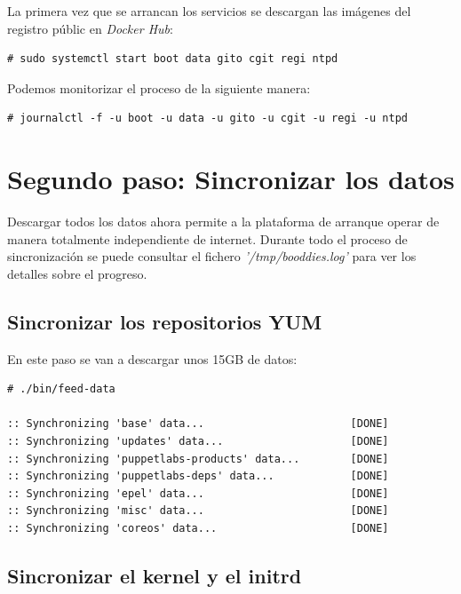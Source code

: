 \documentclass[a4paper,12pt,spanish,final]{epsc_tfc_pfc}
\begin{document}
La primera vez que se arrancan los servicios se descargan las imágenes del registro públic en \emph{Docker Hub}:\\

\begin{lstlisting}[style=dnsmasq]
# sudo systemctl start boot data gito cgit regi ntpd
\end{lstlisting}

Podemos monitorizar el proceso de la siguiente manera:\\

\begin{lstlisting}[style=dnsmasq]
# journalctl -f -u boot -u data -u gito -u cgit -u regi -u ntpd
\end{lstlisting}

\section{Segundo paso: Sincronizar los datos}

Descargar todos los datos ahora permite a la plataforma de arranque operar de manera totalmente independiente de internet. Durante todo el proceso de sincronización se puede consultar el fichero \emph{'/tmp/booddies.log'} para ver los detalles sobre el progreso.

\subsection{Sincronizar los repositorios YUM}

En este paso se van a descargar unos 15GB de datos:\\

\begin{lstlisting}[style=dnsmasq]
# ./bin/feed-data

:: Synchronizing 'base' data...                       [DONE]
:: Synchronizing 'updates' data...                    [DONE]
:: Synchronizing 'puppetlabs-products' data...        [DONE]
:: Synchronizing 'puppetlabs-deps' data...            [DONE]
:: Synchronizing 'epel' data...                       [DONE]
:: Synchronizing 'misc' data...                       [DONE]
:: Synchronizing 'coreos' data...                     [DONE]
\end{lstlisting}

\subsection{Sincronizar el kernel y el initrd}
\end{document}
